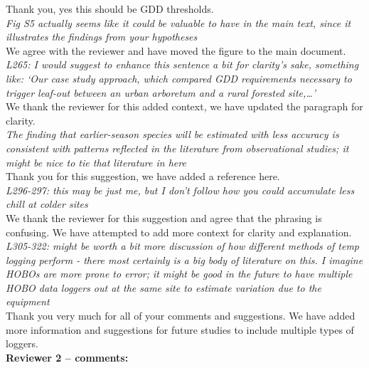 \documentclass[11pt,a4paper]{article}\usepackage[]{graphicx}\usepackage[]{color}
\begin{document}
Thank you, yes this should be GDD thresholds. \\

\textit{Fig S5 actually seems like it could be valuable to have in the main text, since it illustrates the findings from your hypotheses} \\

We agree with the reviewer and have moved the figure to the main document. \\

\textit{L265: I would suggest to enhance this sentence a bit for clarity's sake, something like: `Our case study approach, which compared GDD requirements necessary to trigger leaf-out between an urban arboretum and a rural forested site,…'} \\

We thank the reviewer for this added context, we have updated the paragraph for clarity. \\

\textit{The finding that earlier-season species will be estimated with less accuracy is consistent with patterns reflected in the literature from observational studies; it might be nice to tie that literature in here} \\

Thank you for this suggestion, we have added a reference here. \\

\textit{L296-297: this may be just me, but I don't follow how you could accumulate less chill at colder sites} \\

We thank the reviewer for this suggestion and agree that the phrasing is confusing. We have attempted to add more context for clarity and explanation. \\

\textit{L305-322: might be worth a bit more discussion of how different methods of temp logging perform - there most certainly is a big body of literature on this. I imagine HOBOs are more prone to error; it might be good in the future to have multiple HOBO data loggers out at the same site to estimate variation due to the equipment} \\

Thank you very much for all of your comments and suggestions. We have added more information and suggestions for future studies to include multiple types of loggers. \\

\textbf {Reviewer 2 -- comments:} \\
\end{document}
